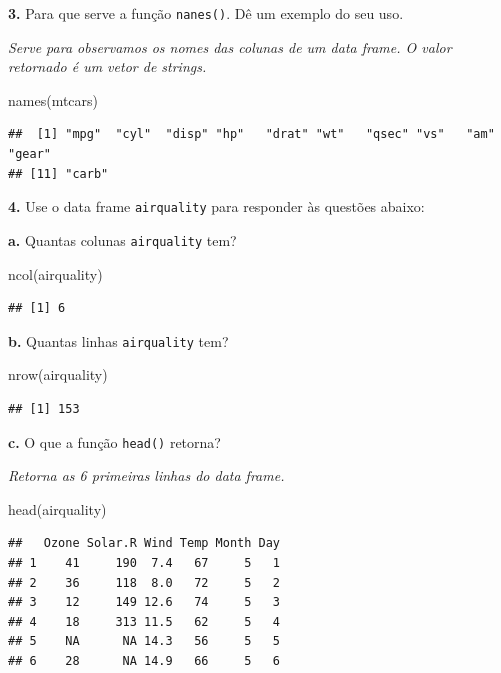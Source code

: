 \documentclass[
]{book}
\newenvironment{Shaded}{\begin{snugshade}}{\end{snugshade}}
\newcommand{\FunctionTok}[1]{\textcolor[rgb]{0.00,0.00,0.00}{#1}}
\newcommand{\NormalTok}[1]{#1}
\begin{document}
\textbf{3.} Para que serve a função \texttt{nanes()}. Dê um exemplo do seu uso.

\emph{Serve para observamos os nomes das colunas de um data frame. O valor retornado é um vetor de strings.}

\begin{Shaded}
\begin{Highlighting}[]
\FunctionTok{names}\NormalTok{(mtcars)}
\end{Highlighting}
\end{Shaded}

\begin{verbatim}
##  [1] "mpg"  "cyl"  "disp" "hp"   "drat" "wt"   "qsec" "vs"   "am"   "gear"
## [11] "carb"
\end{verbatim}

\textbf{4.} Use o data frame \texttt{airquality} para responder às questões abaixo:

\textbf{a.} Quantas colunas \texttt{airquality} tem?

\begin{Shaded}
\begin{Highlighting}[]
\FunctionTok{ncol}\NormalTok{(airquality)}
\end{Highlighting}
\end{Shaded}

\begin{verbatim}
## [1] 6
\end{verbatim}

\textbf{b.} Quantas linhas \texttt{airquality} tem?

\begin{Shaded}
\begin{Highlighting}[]
\FunctionTok{nrow}\NormalTok{(airquality)}
\end{Highlighting}
\end{Shaded}

\begin{verbatim}
## [1] 153
\end{verbatim}

\textbf{c.} O que a função \texttt{head()} retorna?

\emph{Retorna as 6 primeiras linhas do data frame.}

\begin{Shaded}
\begin{Highlighting}[]
\FunctionTok{head}\NormalTok{(airquality)}
\end{Highlighting}
\end{Shaded}

\begin{verbatim}
##   Ozone Solar.R Wind Temp Month Day
## 1    41     190  7.4   67     5   1
## 2    36     118  8.0   72     5   2
## 3    12     149 12.6   74     5   3
## 4    18     313 11.5   62     5   4
## 5    NA      NA 14.3   56     5   5
## 6    28      NA 14.9   66     5   6
\end{verbatim}
\end{document}
